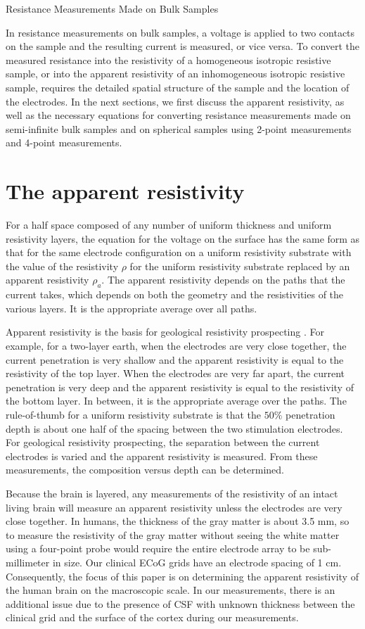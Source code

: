 Resistance Measurements Made on Bulk Samples

In resistance measurements on bulk samples, a voltage is applied to two contacts on the sample and the resulting current is measured, or vice versa. To convert the measured resistance into the resistivity of a homogeneous isotropic resistive sample, or into the apparent resistivity of an inhomogeneous isotropic resistive sample, requires the detailed spatial structure of the sample and the location of the electrodes. In the next sections, we first discuss the apparent resistivity, as well as the necessary equations for converting resistance measurements made on semi-infinite bulk samples and on spherical samples using 2-point measurements and 4-point measurements.


\section{The apparent resistivity}
For a half space composed of any number of uniform thickness and uniform resistivity layers, the equation for the voltage on the surface has the same form as that for the same electrode configuration on a uniform resistivity substrate with the value of the resistivity $\rho$ for the uniform resistivity substrate replaced by an apparent resistivity $\rho_a$. The apparent resistivity depends on the paths that the current takes, which depends on both the geometry and the resistivities of the various layers. It is the appropriate average over all paths. 

Apparent resistivity is the basis for geological resistivity prospecting \cite{W.M.TelfordL.PGeldart1990}. For example, for a two-layer earth, when the electrodes are very close together, the current penetration is very shallow and the apparent resistivity is equal to the resistivity of the top layer. When the electrodes are very far apart, the current penetration is very deep and the apparent resistivity is equal to the resistivity of the bottom layer. In between, it is the appropriate average over the paths. The rule-of-thumb for a uniform resistivity substrate is that the $ 50 \%$ penetration depth is about one half of the spacing between the two stimulation electrodes. For geological resistivity prospecting, the separation between the current electrodes is varied and the apparent resistivity is measured. From these measurements, the composition versus depth can be determined.

Because the brain is layered, any measurements of the resistivity of an intact living brain will measure an apparent resistivity unless the electrodes are very close together. In humans, the thickness of the gray matter is about 3.5 mm, so to measure the resistivity of the gray matter without seeing the white matter using a four-point probe would require the entire electrode array to be sub-millimeter in size. Our clinical ECoG grids have an electrode spacing of 1 cm. Consequently, the focus of this paper is on determining the apparent resistivity of the human brain on the macroscopic scale. In our measurements, there is an additional issue  due to the presence of CSF with unknown thickness between the clinical grid and the surface of the cortex during our measurements. 


